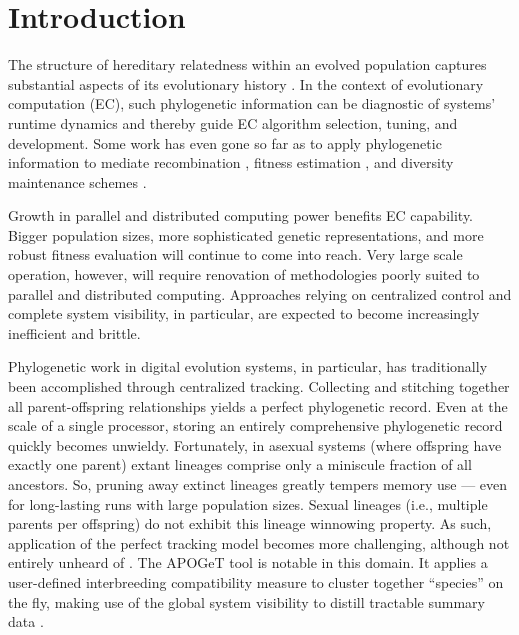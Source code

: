 \section{Introduction} \label{sec:introduction}

The structure of hereditary relatedness within an evolved population captures substantial aspects of its evolutionary history \citep{dolson2019modes}.
In the context of evolutionary computation (EC), such phylogenetic information can be diagnostic of systems' runtime dynamics and thereby guide EC algorithm selection, tuning, and development.
Some work has even gone so far as to apply phylogenetic information to mediate recombination \citep{stanley2002evolving}, fitness estimation \citep{lalejini2023phylogeny}, and diversity maintenance schemes \citep{burke2003increased,murphy2008simple}.

Growth in parallel and distributed computing power benefits EC capability.
Bigger population sizes, more sophisticated genetic representations, and more robust fitness evaluation will continue to come into reach.
Very large scale operation, however, will require renovation of methodologies poorly suited to parallel and distributed computing.
Approaches relying on centralized control and complete system visibility, in particular, are expected to become increasingly inefficient and brittle.

Phylogenetic work in digital evolution systems, in particular, has traditionally been accomplished through centralized tracking.
Collecting and stitching together all parent-offspring relationships yields a perfect phylogenetic record.
Even at the scale of a single processor, storing an entirely comprehensive phylogenetic record quickly becomes unwieldy.
Fortunately, in asexual systems (where offspring have exactly one parent) extant lineages comprise only a miniscule fraction of all ancestors.
So, pruning away extinct lineages greatly tempers memory use --- even for long-lasting runs with large population sizes.
Sexual lineages (i.e., multiple parents per offspring) do not exhibit this lineage winnowing property.
As such, application of the perfect tracking model becomes more challenging, although not entirely unheard of \citep{mcphee2018detailed,mcphee2016using,burlacu2013visualization}.
The APOGeT tool is notable in this domain.
It applies a user-defined interbreeding compatibility measure to cluster together ``species'' on the fly, making use of the global system visibility to distill tractable summary data \citep{godin2019apoget}.

